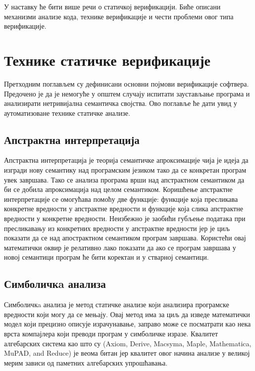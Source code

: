 \documentclass[a4paper]{article}
\begin{document}
{У наставку ће бити више речи о статичкој верификацији. Биће описани механизми анализе кода, технике верификације и чести проблеми овог типа верификације.
\section{Технике статичке верификације}
Претходним поглављем су дефинисани основни појмови верификације софтвера. Предочено је да је немогуће у општем случају испитати заустављање програма и анализирати нетривијална семантичка својства. Ово поглавље ће дати увид у аутоматизоване технике статичке анализе.

\subsection{Апстрактна интерпретација}
Апстрактна интерпретација је теорија семантичке апроксимације чија је идеја да изгради нову семантику над програмским језиком тако да се конкретан програм увек завршава. Тако се анализа програма врши над апстрактном семантиком да би се добила апроксимација над целом семантиком. Коришћење апстрактне интерпретације се омогућава помоћу две функције: функције која пресликава конкретне вредности у апстрактне вредности и функције која слика апстрактне вредности у конкретне вредности. Неизбежно је заобићи губљење података при пресликавању из конкретних вредности у апстрактне вредности јер је циљ показати да се над апострактном семантиком програм завршава. Користећи овај математички оквир је релативно лако показати да ако се програм завршава у новој семантици програм ће бити коректан и у стварној семантици.


\subsection{Симболичкa анализа}
Симболичкa анализа је метод статичке анализе који анализира програмске вредности који могу да се мењају. Овај метод има за циљ да изведе математички модел који прецизно описује израчунавање, заправо може се посматрати као нека врста компајлера који преводи програм у симболичке изразе. Квалитет алгебарских система као што су (Axiom, Derive, Macsyma, Maple, Mathematica, MuPAD, and Reduce) је веома битан јер квалитет овог начина анализе у великој мерим зависи од паметних алгебарских упрошћавања.


}
\end{document}
